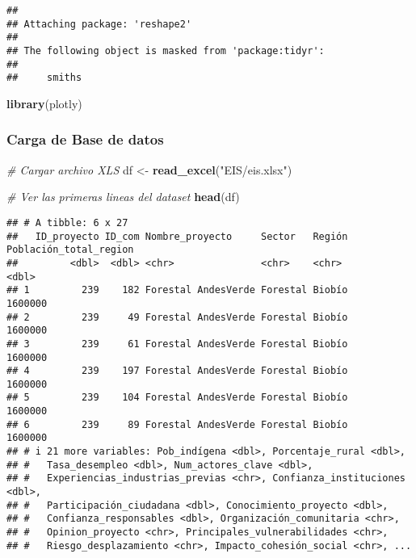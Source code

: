 \documentclass[
]{article}
\newenvironment{Shaded}{\begin{snugshade}}{\end{snugshade}}
\newcommand{\CommentTok}[1]{\textcolor[rgb]{0.56,0.35,0.01}{\textit{#1}}}
\newcommand{\FunctionTok}[1]{\textcolor[rgb]{0.13,0.29,0.53}{\textbf{#1}}}
\newcommand{\NormalTok}[1]{#1}
\newcommand{\OtherTok}[1]{\textcolor[rgb]{0.56,0.35,0.01}{#1}}
\newcommand{\StringTok}[1]{\textcolor[rgb]{0.31,0.60,0.02}{#1}}
\begin{document}
\begin{verbatim}
## 
## Attaching package: 'reshape2'
## 
## The following object is masked from 'package:tidyr':
## 
##     smiths
\end{verbatim}

\begin{Shaded}
\begin{Highlighting}[]
\FunctionTok{library}\NormalTok{(plotly)}
\end{Highlighting}
\end{Shaded}

\subsubsection{Carga de Base de datos}\label{carga-de-base-de-datos}

\begin{Shaded}
\begin{Highlighting}[]
\CommentTok{\# Cargar archivo XLS}
\NormalTok{df }\OtherTok{\textless{}{-}} \FunctionTok{read\_excel}\NormalTok{(}\StringTok{"EIS/eis.xlsx"}\NormalTok{)}

\CommentTok{\# Ver las primeras lineas del dataset}
\FunctionTok{head}\NormalTok{(df)}
\end{Highlighting}
\end{Shaded}

\begin{verbatim}
## # A tibble: 6 x 27
##   ID_proyecto ID_com Nombre_proyecto     Sector   Región Población_total_region
##         <dbl>  <dbl> <chr>               <chr>    <chr>                   <dbl>
## 1         239    182 Forestal AndesVerde Forestal Biobío                1600000
## 2         239     49 Forestal AndesVerde Forestal Biobío                1600000
## 3         239     61 Forestal AndesVerde Forestal Biobío                1600000
## 4         239    197 Forestal AndesVerde Forestal Biobío                1600000
## 5         239    104 Forestal AndesVerde Forestal Biobío                1600000
## 6         239     89 Forestal AndesVerde Forestal Biobío                1600000
## # i 21 more variables: Pob_indígena <dbl>, Porcentaje_rural <dbl>,
## #   Tasa_desempleo <dbl>, Num_actores_clave <dbl>,
## #   Experiencias_industrias_previas <chr>, Confianza_instituciones <dbl>,
## #   Participación_ciudadana <dbl>, Conocimiento_proyecto <dbl>,
## #   Confianza_responsables <dbl>, Organización_comunitaria <chr>,
## #   Opinion_proyecto <chr>, Principales_vulnerabilidades <chr>,
## #   Riesgo_desplazamiento <chr>, Impacto_cohesión_social <chr>, ...
\end{verbatim}
\end{document}
